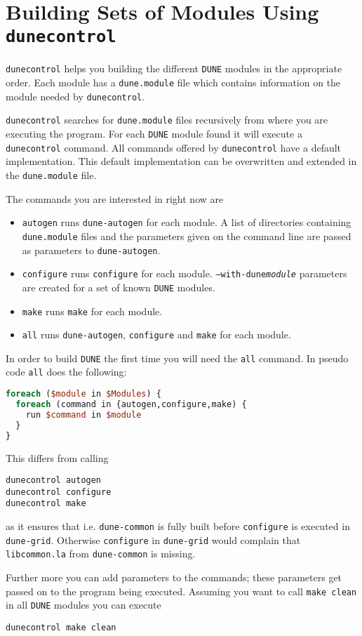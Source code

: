 \documentclass[11pt,a4paper,headinclude,footinclude,DIV16,normalheadings]{scrartcl}
\newcommand{\dune}{\texttt{DUNE}\xspace}
\newcommand{\autogen}{\texttt{dune-autogen}\xspace}
\newcommand{\configure}{\texttt{configure}\xspace}
\newcommand{\dunecommon}{\texttt{dune-common}\xspace}
\newcommand{\dunegrid}{\texttt{dune-grid}\xspace}
\newcommand{\dunecontrol}{\texttt{dunecontrol}\xspace}
\newcommand{\dunemodule}{\texttt{dune.module}\xspace}
\newcommand{\make}{\texttt{make}\xspace}
\begin{document}
\section{Building Sets of Modules Using \dunecontrol}
\label{dunecontrol}
\dunecontrol helps you building the different \dune modules in the
appropriate order. Each module has a \dunemodule file which contains
information on the module needed by \dunecontrol. 

\dunecontrol searches for \dunemodule files recursively from where you
are executing the program. For each \dune module found it will execute
a \dunecontrol command. All commands offered by \dunecontrol have a
default implementation. This default implementation can be overwritten
and extended in the \dunemodule file.

The commands you are interested in right now are
\begin{itemize}
\item \texttt{autogen} runs \autogen for each module. A list of
  directories containing \dunemodule files and the parameters given on
  the command line are passed as parameters to \autogen.
\item \texttt{configure} runs \configure for each
  module. \texttt{--with-dune\textit{module}} parameters are created
  for a set of known \dune modules.
\item \texttt{make} runs \make for each module.
\item \texttt{all} runs \autogen, \configure and \make for each module.
\end{itemize}

In order to build \dune the first time you will need the \texttt{all}
command. In pseudo code \texttt{all} does the following:
\begin{lstlisting}[language=Perl]
foreach ($module in $Modules) {
  foreach (command in {autogen,configure,make) {
    run $command in $module
  }
}
\end{lstlisting}

This differs from calling
\begin{lstlisting}
dunecontrol autogen
dunecontrol configure
dunecontrol make
\end{lstlisting}
as it ensures that i.e. \dunecommon is fully built before \configure
is executed in \dunegrid. Otherwise \configure in \dunegrid would
complain that \texttt{libcommon.la} from \dunecommon is missing.

Further more you can add parameters to the commands; these parameters
get passed on to the program being executed. Assuming you want to call
\texttt{make clean} in all \dune modules you can execute
\begin{lstlisting}
dunecontrol make clean
\end{lstlisting}
\end{document}
